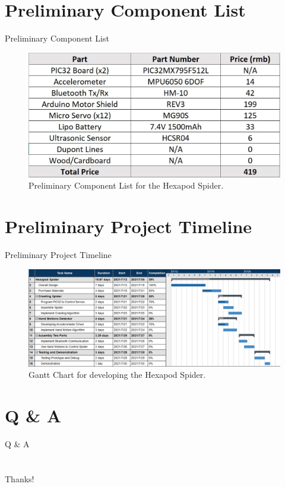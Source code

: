 \documentclass[12pt]{beamer}
\begin{document}
\section{Preliminary Component List}
\begin{frame}{Preliminary Component List}
    \begin{figure}[H]
        \centering
        \includegraphics[width=1\textwidth]{materials.JPG}
        \caption{Preliminary Component List for the Hexapod Spider.}
    \end{figure}
\end{frame}

\section{Preliminary Project Timeline}
\begin{frame}{Preliminary Project Timeline}
    \begin{figure}[H]
        \centering
        \includegraphics[width=1\textwidth]{Hexapod Spider.jpg}
        \caption{Gantt Chart for developing the Hexapod Spider.}
    \end{figure}
\end{frame}

\section{Q \& A}
\begin{frame}
    \begin{center}
        Q \& A
    \end{center}
\end{frame}

\section{}
\begin{frame}
    \begin{center}
        Thanks!
    \end{center}
\end{frame}
\end{document}
